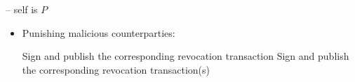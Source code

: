 \begin{center}
\begin{processbox}{\pchan -- self is $P$}
\begin{itemize}
      \item Punishing malicious counterparties:
      \begin{algorithmic}[0]
        \State {}
          \State Sign and publish the corresponding revocation transaction
        \EndIf
          \State Sign and publish the corresponding revocation transaction(s)
        \EndIf
      \end{algorithmic}
    \end{itemize}
  \end{processbox}
  \label{code:pseudocode}
\end{center} \ \\
